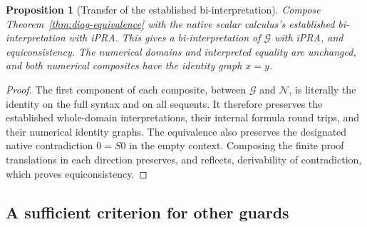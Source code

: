 \documentclass[11pt]{article}
\newtheorem{proposition}[theorem]{Proposition}
\theoremstyle{definition}
\theoremstyle{remark}
\begin{document}
\begin{proposition}[Transfer of the established bi-interpretation]
\label{prop:diag-ipra}
Compose Theorem~\ref{thm:diag-equivalence} with the native scalar
calculus's established bi-interpretation with iPRA.  This gives a
bi-interpretation of $\mathcal G$ with iPRA, and equiconsistency.
The numerical domains and interpreted equality are unchanged, and both
numerical composites have the identity graph $x=y$.
\end{proposition}
\begin{proof}
The first component of each composite, between $\mathcal G$ and
$\mathcal N$, is literally the identity on the full syntax and on all
sequents.  It therefore preserves the established whole-domain
interpretations, their internal formula round trips, and their numerical
identity graphs.  The equivalence also preserves the designated native
contradiction $0=S0$ in the empty context.  Composing the finite proof
translations in each direction preserves, and reflects, derivability of
contradiction, which proves equiconsistency.
\end{proof}

\subsection{A sufficient criterion for other guards}
\end{document}
